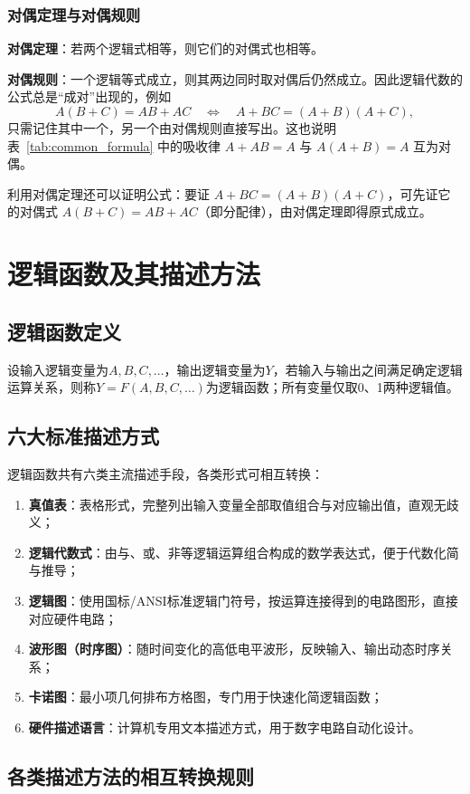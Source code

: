 \subsubsection{对偶定理与对偶规则}
\textbf{对偶定理}：若两个逻辑式相等，则它们的对偶式也相等。

\textbf{对偶规则}：一个逻辑等式成立，则其两边同时取对偶后仍然成立。因此逻辑代数的公式总是``成对''出现的，例如
\[
A(B+C)=AB+AC
\quad\Longleftrightarrow\quad
A+BC=(A+B)(A+C),
\]
只需记住其中一个，另一个由对偶规则直接写出。这也说明表~\ref{tab:common_formula} 中的吸收律 $A+AB=A$ 与 $A(A+B)=A$ 互为对偶。

利用对偶定理还可以证明公式：要证 $A+BC=(A+B)(A+C)$，可先证它的对偶式 $A(B+C)=AB+AC$（即分配律），由对偶定理即得原式成立。

\section{逻辑函数及其描述方法}
\subsection{逻辑函数定义}
设输入逻辑变量为$A,B,C,\dots$，输出逻辑变量为$Y$，若输入与输出之间满足确定逻辑运算关系，则称$Y=F(A,B,C,\dots)$为逻辑函数；所有变量仅取0、1两种逻辑值。

\subsection{六大标准描述方式}
逻辑函数共有六类主流描述手段，各类形式可相互转换：
\begin{enumerate}
    \item \textbf{真值表}：表格形式，完整列出输入变量全部取值组合与对应输出值，直观无歧义；
    \item \textbf{逻辑代数式}：由与、或、非等逻辑运算组合构成的数学表达式，便于代数化简与推导；
    \item \textbf{逻辑图}：使用国标/ANSI标准逻辑门符号，按运算连接得到的电路图形，直接对应硬件电路；
    \item \textbf{波形图（时序图）}：随时间变化的高低电平波形，反映输入、输出动态时序关系；
    \item \textbf{卡诺图}：最小项几何排布方格图，专门用于快速化简逻辑函数；
    \item \textbf{硬件描述语言}：计算机专用文本描述方式，用于数字电路自动化设计。
\end{enumerate}

\subsection{各类描述方法的相互转换规则}
